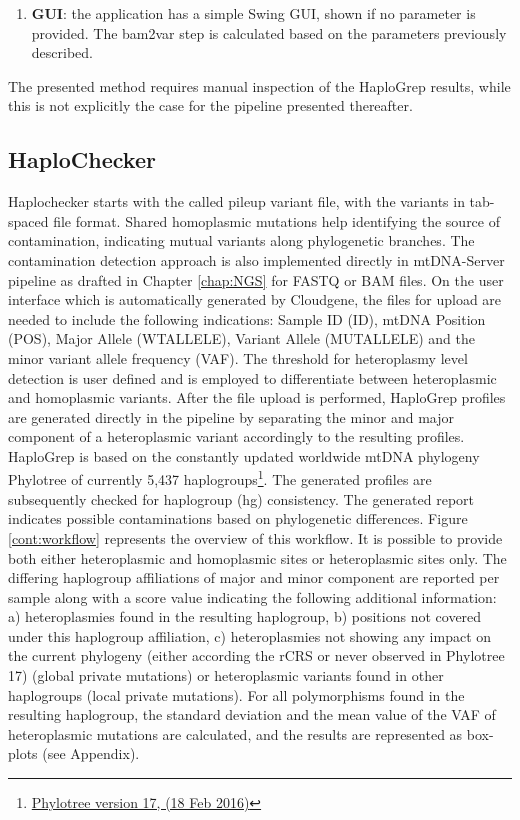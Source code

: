 \begin{enumerate}
\begin{lstlisting}[language=bash]
java -jar greenVC-0.1.jar lofreq --in inputfile.vcf --out haplogrepinput.hsd 
\end{lstlisting}
\item \textbf{GUI}: the application has a simple Swing GUI, shown if no parameter is provided. The bam2var step is calculated based on the parameters previously described.
\end{enumerate}
The presented method requires manual inspection of the HaploGrep results, while this is not explicitly the case for the pipeline presented thereafter. 
\subsection{HaploChecker}\label{cont:haplochecker}
Haplochecker starts with the called pileup variant file, with the variants in tab-spaced file format. Shared homoplasmic mutations help identifying the source of contamination, indicating mutual variants along phylogenetic branches. The contamination detection approach is also implemented directly in mtDNA-Server pipeline as drafted in Chapter \ref{chap:NGS} for FASTQ or BAM files. On the user interface which is automatically generated by Cloudgene, the files for upload are needed to include the following indications: Sample ID (ID), mtDNA Position (POS), Major Allele (WTALLELE), Variant Allele (MUTALLELE) and the minor variant allele frequency (VAF). The threshold for heteroplasmy level detection is user defined and is employed to differentiate between heteroplasmic and homoplasmic variants. After the file upload is performed, HaploGrep  profiles are generated directly in the pipeline by separating the minor and major component of a heteroplasmic variant accordingly to the resulting profiles. HaploGrep is based on the constantly updated worldwide mtDNA phylogeny Phylotree of currently 5,437 haplogroups\footnote{\url{Phylotree version 17, (18 Feb 2016)}}. The generated profiles are subsequently checked for haplogroup (hg) consistency. The generated report indicates possible contaminations based on phylogenetic differences. Figure \ref{cont:workflow} represents the overview of this workflow. It is possible to provide both either heteroplasmic and homoplasmic sites or heteroplasmic sites only. The differing haplogroup affiliations of major and minor component are reported per sample along with a score value indicating the following additional information: a) heteroplasmies found in the resulting haplogroup, b) positions not covered under this haplogroup affiliation, c) heteroplasmies not showing any impact on the current phylogeny (either according the rCRS or never observed in Phylotree 17) (global private mutations) or heteroplasmic variants found in other haplogroups (local private mutations). For all polymorphisms found in the resulting haplogroup, the standard deviation and the mean value of the VAF of heteroplasmic mutations are calculated, and the results are represented as box-plots (see Appendix). 
